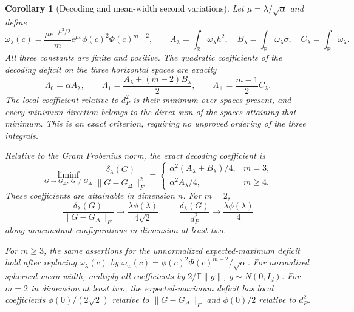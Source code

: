 \documentclass[11pt]{article}
\newtheorem{corollary}[theorem]{Corollary}
\theoremstyle{remark}\newtheorem{remark}[theorem]{Remark}
\newcommand{\R}{\mathbb R}
\newcommand{\E}{\mathbb E}
\begin{document}
\begin{corollary}[Decoding and mean-width second variations]\label{cor:spectrum-integrated}
Let $\mu=\lambda/\sqrt\alpha$ and define
\[
 \omega_\lambda(c)=\frac{\mu e^{-\mu^2/2}}m
 e^{\mu c}\phi(c)^2\Phi(c)^{m-2},\qquad
 A_\lambda=\int_\R\omega_\lambda h^2,\quad
 B_\lambda=\int_\R\omega_\lambda\sigma,\quad
 C_\lambda=\int_\R\omega_\lambda.
\]
All three constants are finite and positive.  The quadratic coefficients
of the decoding deficit on the three horizontal spaces are exactly
\[
 \Lambda_0=\alpha A_\lambda,\qquad
 \Lambda_1=\frac{A_\lambda+(m-2)B_\lambda}{2},\qquad
 \Lambda_\perp=\frac{m-1}{2}C_\lambda.
\]
The local coefficient relative to $d_P^2$ is their minimum over spaces
present, and every minimum direction belongs to the direct sum of the
spaces attaining that minimum.  This is an exact criterion, requiring no
unproved ordering of the three integrals.

Relative to the Gram Frobenius norm, the exact decoding coefficient is
\[
 \liminf_{G\to G_\Delta,\ G\ne G_\Delta}
 \frac{\delta_\lambda(G)}{\|G-G_\Delta\|_F^2}
 =\begin{cases}
 \alpha^2(A_\lambda+B_\lambda)/4,&m=3,\\
 \alpha^2 A_\lambda/4,&m\ge4.
 \end{cases}
\]
These coefficients are attainable in dimension $n$.  For $m=2$,
\[
 \frac{\delta_\lambda(G)}{\|G-G_\Delta\|_F}
 \longrightarrow\frac{\lambda\phi(\lambda)}{4\sqrt2},
 \qquad
 \frac{\delta_\lambda(G)}{d_P^2}
 \longrightarrow\frac{\lambda\phi(\lambda)}4
\]
along nonconstant configurations in dimension at least two.

For $m\ge3$, the same assertions for the unnormalized expected-maximum deficit hold
after replacing $\omega_\lambda(c)$ by
$\omega_w(c)=\phi(c)^2\Phi(c)^{m-2}/\sqrt\alpha$.
For normalized spherical mean width, multiply all coefficients by
$2/\E\|g\|$, $g\sim N(0,I_d)$.
For $m=2$ in dimension at least two, the expected-maximum deficit has
local coefficients $\phi(0)/(2\sqrt2)$ relative to
$\|G-G_\Delta\|_F$ and $\phi(0)/2$ relative to $d_P^2$.
\end{corollary}
\end{document}
